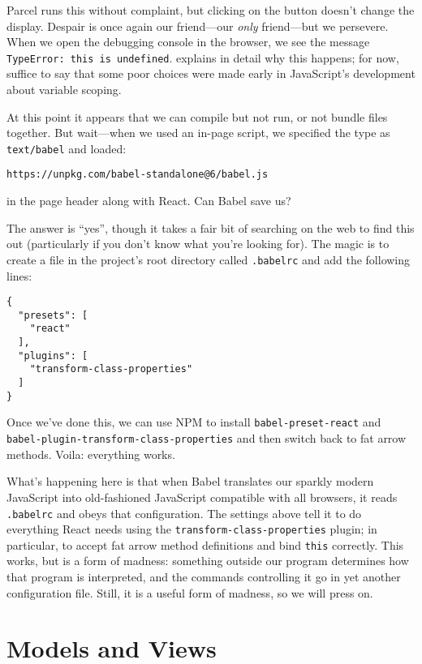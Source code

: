 Parcel runs this without complaint,
but clicking on the button doesn't change the display.
Despair is once again our friend---our \emph{only} friend---but we persevere.
When we open the debugging console in the browser,
we see the message \texttt{TypeError: this is undefined}.
 explains in detail why this happens;
for now,
suffice to say that some poor choices were made early in JavaScript's development about variable scoping.

At this point it appears that we can compile but not run, or not bundle files together.
But wait---when we used an in-page script,
we specified the type as \texttt{text/babel} and loaded:

\begin{verbatim}
https://unpkg.com/babel-standalone@6/babel.js
\end{verbatim}

\noindent
in the page header along with React.
Can Babel save us?

The answer is ``yes'',
though it takes a fair bit of searching on the web to find this out
(particularly if you don't know what you're looking for).
The magic is to create a file in the project's root directory called \texttt{.babelrc}
and add the following lines:

\begin{verbatim}
{
  "presets": [
    "react"
  ],
  "plugins": [
    "transform-class-properties"
  ]
}
\end{verbatim}

Once we've done this,
we can use NPM to install \texttt{babel-preset-react} and \texttt{babel-plugin-transform-class-properties}
and then switch back to fat arrow methods.
Voila: everything works.

What's happening here is that
when Babel translates our sparkly modern JavaScript into old-fashioned JavaScript compatible with all browsers,
it reads \texttt{.babelrc} and obeys that configuration.
The settings above tell it to do everything React needs using the \texttt{transform-class-properties} plugin;
in particular,
to accept fat arrow method definitions and bind \texttt{this} correctly.
This works,
but is a form of madness:
something outside our program determines how that program is interpreted,
and the commands controlling it go in yet another configuration file.
Still,
it is a useful form of madness,
so we will press on.

\section{Models and Views}\label{s:interactive-models-views}

